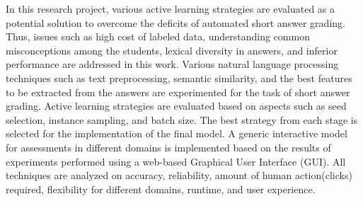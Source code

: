 In this research project, various active learning strategies are evaluated as a potential solution to overcome the deficits of automated short answer grading. Thus, issues such as high cost of labeled data, understanding common misconceptions among the students, lexical diversity in answers, and inferior performance are addressed in this work. Various natural language processing techniques such as text preprocessing, semantic similarity, and the best features to be extracted from the answers are experimented for the task of short answer grading. Active learning strategies are evaluated based on aspects such as seed selection, instance sampling, and batch size. The best strategy from each stage is selected for the implementation of the final model. A generic interactive model for assessments in different domains is implemented based on the results of experiments performed using a web-based Graphical User Interface (GUI). All techniques are analyzed on accuracy, reliability, amount of human action(clicks) required, flexibility for different domains, runtime, and user experience. 


